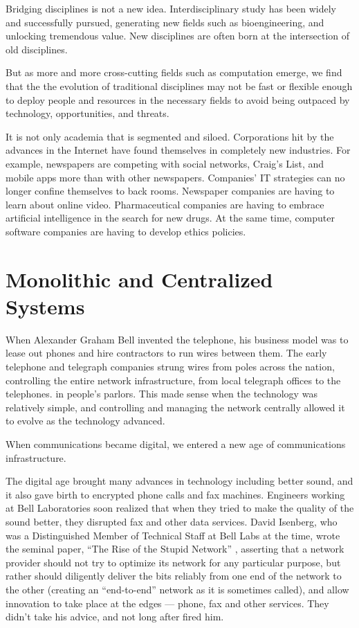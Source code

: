 Bridging disciplines is not a new idea. Interdisciplinary study has been widely and successfully pursued, generating new fields such as bioengineering, and unlocking tremendous value. New disciplines are often born at the intersection of old disciplines.

But as more and more cross-cutting fields such as computation emerge, we find that the the evolution of traditional disciplines may not be fast or flexible enough to deploy people and resources in the necessary fields to avoid being outpaced by technology, opportunities, and threats.

It is not only academia that is segmented and siloed. Corporations hit by the advances in the Internet have found themselves in completely new industries. For example, newspapers are competing with social networks, Craig's List, and mobile apps more than with other newspapers. Companies' IT strategies can no longer confine themselves to back rooms. Newspaper companies are having to learn about online video. Pharmaceutical companies are having to embrace artificial intelligence in the search for new drugs. At the same time, computer software companies are having to develop ethics policies.

\section{Monolithic and Centralized Systems}
\label{monoliths}

When Alexander Graham Bell invented the telephone, his business model was to lease out phones and hire contractors to run wires between them. The early telephone and telegraph companies strung wires from poles across the nation, controlling the entire network infrastructure, from local telegraph offices to the telephones. in people's parlors. This made sense when the technology was relatively simple, and controlling and managing the network centrally allowed it to evolve as the technology advanced.

When communications became digital, we entered a new age of communications infrastructure.

The digital age brought many advances in technology including better sound, and it also gave birth to encrypted phone calls and fax machines. Engineers working at Bell Laboratories soon realized that when they tried to make the quality of the sound better, they disrupted fax and other data services. David Isenberg, who was a Distinguished Member of Technical Staff at Bell Labs at the time, wrote the seminal paper, ``The Rise of the Stupid Network'' \cite{isenberg1997rise}, asserting that a network provider should not try to optimize its network for any particular purpose, but rather should diligently deliver the bits reliably from one end of the network to the other (creating an ``end-to-end'' network as it is sometimes called), and allow innovation to take place at the edges --- phone, fax and other services. They didn't take his advice, and not long after fired him.


